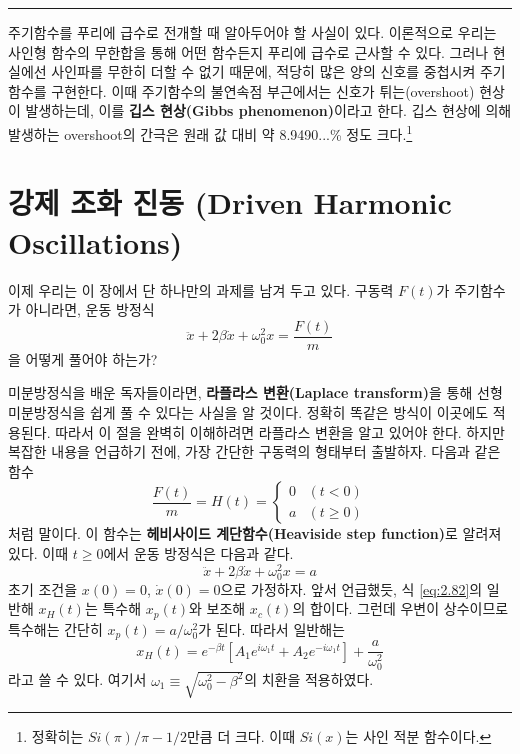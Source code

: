 \documentclass[chapter, oneside, b5paper]{oblivoir}
\theoremstyle{plain}
\theoremstyle{definition}
\theoremstyle{remark}
\begin{document}
\noindent\rule{\textwidth}{0.8pt} %
\vspace{1em} %

주기함수를 푸리에 급수로 전개할 때 알아두어야 할 사실이 있다. 이론적으로 우리는 사인형 함수의 무한합을 통해 어떤 함수든지 푸리에 급수로 근사할 수 있다. 그러나 현실에선 사인파를 무한히 더할 수 없기 때문에, 적당히 많은 양의 신호를 중첩시켜 주기함수를 구현한다. 이때 주기함수의 불연속점 부근에서는 신호가 튀는(overshoot) 현상이 발생하는데, 이를 \textbf{깁스 현상(Gibbs phenomenon)}이라고 한다. 깁스 현상에 의해 발생하는 overshoot의 간극은 원래 값 대비 약 8.9490...\% 정도 크다.\footnote{정확히는 $Si(\pi)/\pi - 1/2$만큼 더 크다. 이때 $Si(x)$는 사인 적분 함수이다.}

\section{강제 조화 진동 (Driven Harmonic Oscillations)}
이제 우리는 이 장에서 단 하나만의 과제를 남겨 두고 있다. 구동력 $F(t)$가 주기함수가 아니라면, 운동 방정식
\begin{equation}
    \ddot{x} + 2\beta \dot{x} + \omega_0^2x = \frac{F(t)}{m} \label{eq:2.80}
\end{equation}
을 어떻게 풀어야 하는가?

미분방정식을 배운 독자들이라면, \textbf{라플라스 변환(Laplace transform)}을 통해 선형 미분방정식을 쉽게 풀 수 있다는 사실을 알 것이다. 정확히 똑같은 방식이 이곳에도 적용된다. 따라서 이 절을 완벽히 이해하려면 라플라스 변환을 알고 있어야 한다. 하지만 복잡한 내용을 언급하기 전에, 가장 간단한 구동력의 형태부터 출발하자. 다음과 같은 함수
\begin{equation}
    \frac{F(t)}{m} = H(t) = \begin{cases}
    0 & (t<0) \\
    a & (t \ge 0) \end{cases}
    \label{heaviside step function}
\end{equation}
처럼 말이다. 이 함수는 \textbf{헤비사이드 계단함수(Heaviside step function)}로 알려져 있다. 이때 $t \ge 0$에서 운동 방정식은 다음과 같다.
\begin{equation}
    \ddot{x} + 2\beta \dot{x} + \omega_0^2x = a \label{eq:2.82}
\end{equation}
초기 조건을 $x(0)=0$, $\dot{x}(0)=0$으로 가정하자. 앞서 언급했듯, 식 \ref{eq:2.82}의 일반해 $x_H(t)$는 특수해 $x_p(t)$와 보조해 $x_c(t)$의 합이다. 그런데 우변이 상수이므로 특수해는 간단히 $x_p(t) = a/\omega_0^2$가 된다. 따라서 일반해는
\begin{equation}
    x_H(t) = e^{-\beta t}[A_1e^{i\omega_1t}+A_2e^{-i\omega_1t}] + \frac{a}{\omega_0^2} \label{eq:2.83}
\end{equation}
라고 쓸 수 있다. 여기서 $\omega_1 \equiv \sqrt{\omega_0^2-\beta^2}$의 치환을 적용하였다.
\end{document}
